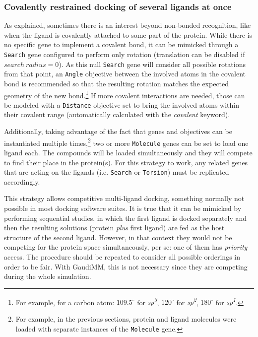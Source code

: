 \subsubsection{Covalently restrained docking of several ligands at once}
\label{section:multidocking}

As explained, sometimes there is an interest beyond non-bonded recognition, like when the ligand is covalently attached to some part of the protein. While there is no specific gene to implement a covalent bond, it can be mimicked through a \texttt{Search} gene configured to perform only rotation (translation can be disabled if $search~radius=0$). As this null \texttt{Search} gene will consider all possible rotations from that point, an \texttt{Angle} objective between the involved atoms in the covalent bond is recommended so that the resulting rotation matches the expected geometry of the new bond.\footnote{For example, for a carbon atom: $109.5^{\circ}$ for \textit{sp\textsuperscript{3}}, $120^{\circ}$ for \textit{sp\textsuperscript{2}}, $180^{\circ}$ for \textit{sp\textsuperscript{1}}.} If more covalent interactions are needed, those can be modeled with a \texttt{Distance} objective set to bring the involved atoms within their covalent range (automatically calculated with the \textit{covalent} keyword).

Additionally, taking advantage of the fact that genes and objectives can be instantiated multiple times,\footnote{For example, in the previous sections, protein and ligand molecules were loaded with separate instances of the \texttt{Molecule} gene.} two or more \texttt{Molecule} genes can be set to load one ligand each. The compounds will be loaded simultaneously and they will compete to find their place in the protein(s). For this strategy to work, any related genes that are acting on the ligands (i.e. \texttt{Search} or \texttt{Torsion}) must be replicated accordingly.

This strategy allows competitive multi-ligand docking, something normally not possible in most docking software suites. It is true that it can be mimicked by performing sequential studies, in which the first ligand is docked separately and then the resulting solutions (protein \textit{plus} first ligand) are fed as the host structure of the second ligand. However, in that context they would not be competing for the protein space simultaneously, per se: one of them has \textit{priority} access. The procedure should be repeated to consider all possible orderings in order to be fair. With GaudiMM, this is not necessary since they are competing during the whole simulation.

